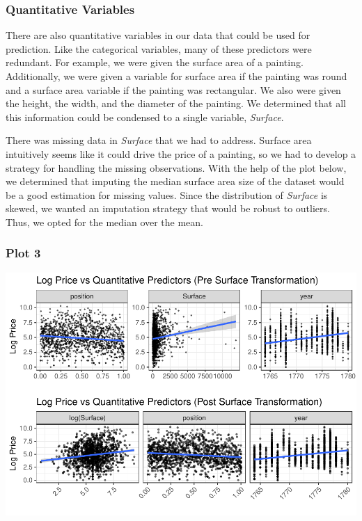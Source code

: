\documentclass[]{article}
\begin{document}
\hypertarget{quantitative-variables}{%
\subsubsection{Quantitative Variables}\label{quantitative-variables}}

There are also quantitative variables in our data that could be used for
prediction. Like the categorical variables, many of these predictors
were redundant. For example, we were given the surface area of a
painting. Additionally, we were given a variable for surface area if the
painting was round and a surface area variable if the painting was
rectangular. We also were given the height, the width, and the diameter
of the painting. We determined that all this information could be
condensed to a single variable, \emph{Surface}.

There was missing data in \emph{Surface} that we had to address. Surface
area intuitively seems like it could drive the price of a painting, so
we had to develop a strategy for handling the missing observations. With
the help of the plot below, we determined that imputing the median
surface area size of the dataset would be a good estimation for missing
values. Since the distribution of \emph{Surface} is skewed, we wanted an
imputation strategy that would be robust to outliers. Thus, we opted for
the median over the mean.

\hypertarget{plot-3}{%
\subsubsection{Plot 3}\label{plot-3}}

\includegraphics{Part-I-Writeup_files/figure-latex/unnamed-chunk-2-1.pdf}
\end{document}
